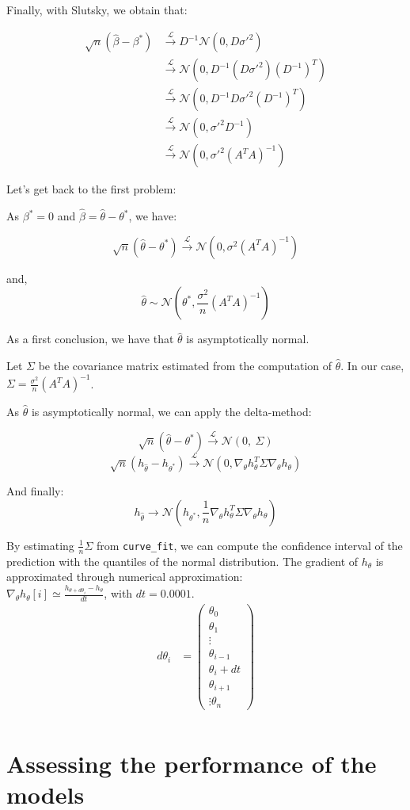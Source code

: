 Finally, with Slutsky, we obtain that: 

\begin{align*}
    \sqrt{n} (\hat{\beta} - \beta^*) &\xrightarrow{\mathcal{L}} D^{-1}\mathcal{N}(0, D \sigma'^2) \\
    &\xrightarrow{\mathcal{L}} \mathcal{N}(0, D^{-1} (D \sigma'^2) (D^{-1})^T) \\
    &\xrightarrow{\mathcal{L}} \mathcal{N}(0, D^{-1} D \sigma'^2 (D^{-1})^{T}) \\
    &\xrightarrow{\mathcal{L}} \mathcal{N}(0, \sigma'^2 D^{-1}) \\
    &\xrightarrow{\mathcal{L}} \mathcal{N}(0, \sigma'^2 (A^T A)^{-1})
\end{align*}


Let's get back to the first problem: 

As $\beta ^* = 0 $ and $\hat{\beta} = \hat{\theta} - \theta ^* $, we have: 

\[
\sqrt{n} (\hat{\theta} - \theta^*) \xrightarrow{\mathcal{L}} \mathcal{N}(0, \sigma^2 (A^T A)^{-1})
\]

and, 
\[
\hat{\theta} \sim \mathcal{N}(\theta^*, \frac{\sigma^2}{n} (A^T A)^{-1})
\]

As a first conclusion, we have that $\hat{\theta}$ is asymptotically normal.

Let $\Sigma$ be the covariance matrix estimated from the computation of $\hat{\theta}$. In our case, $\Sigma = \frac{\sigma^2}{n} (A^T A)^{-1}$. 

As $\hat{\theta}$ is asymptotically normal, we can apply the delta-method: 

\[
\sqrt{n} (\hat{\theta} -\theta^*) \xrightarrow{\mathcal{L}} \mathcal{N}(0, \ \Sigma)
\]
\[
\sqrt{n} (h_{\hat{\theta}} -h_{\theta^*}) \xrightarrow{\mathcal{L}} \mathcal{N}(0, \nabla_\theta h_\theta ^T \Sigma  \nabla_\theta h_\theta)
\]

And finally: 
\[
h_{\hat{\theta}} \rightarrow \mathcal{N}(h_{\theta^*}, \frac{1}{n}\nabla_\theta h_\theta ^T \Sigma  \nabla_\theta h_\theta)
\]

By estimating $\frac{1}{n} \Sigma$ from \texttt{curve\_fit}, we can compute the confidence interval of the prediction with the quantiles of the normal distribution.
The gradient of $h_\theta$ is approximated through numerical approximation: \\
$\nabla_\theta h_\theta [i] \simeq \frac{h_{\theta + d \theta _ i  } - h_\theta}{dt}$, with $dt=0.0001$. \\

\begin{align*}
    d\theta_i &= \begin{pmatrix}
    \theta_0 \\
    \theta_1\\
    \vdots \\
    \theta_{i-1}\\
    \theta_i + dt \\
    \theta_{i+1}\\
    \vdots
    \theta_n 
    \end{pmatrix} \\    
\end{align*}


\section*{Assessing the performance of the models}





